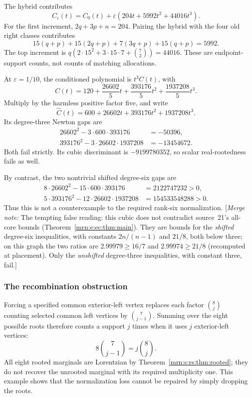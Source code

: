 \documentclass[11pt,a4paper]{article}
\theoremstyle{remark}\newtheorem{remark}[theorem]{Remark}
\newcommand{\mnote}[1]{[\textit{Merge note:} #1]}
\begin{document}
The hybrid contributes
\begin{equation}\label{mrn:s:rs:eq:perturb}
 C_\varepsilon(t)=C_0(t)+\varepsilon(204t+5992t^2+44016t^3).
\end{equation}
For the first increment, $2q+3p+n=204$. Pairing the hybrid with the four old right classes contributes
\[
 15(q+p)+15(2q+p)+7(3q+p)+15(q+p)=5992.
\]
The top increment is
$q(2\cdot15^2+3\cdot15\cdot7+\binom72)=44016$.
These are endpoint-support counts, not counts of matching allocations.

At $\varepsilon=1/10$, the conditioned polynomial is $t^3C(t)$, with
\begin{equation}\label{mrn:s:rs:eq:counter}
 C(t)=120+\frac{26602}{5}t+\frac{393176}{5}t^2
                    +\frac{1937208}{5}t^3.
\end{equation}
Multiply by the harmless positive factor five, and write
\[
 \widehat C(t)=600+26602t+393176t^2+1937208t^3.
\]
Its degree-three Newton gaps are
\begin{align*}
 26602^2-3\cdot600\cdot393176&=-50396,\\
 393176^2-3\cdot26602\cdot1937208&=-13454672.
\end{align*}
Both fail strictly. Its cubic discriminant is $-9199780352$, so scalar real-rootedness fails as well.

By contrast, the two nontrivial shifted degree-six gaps are
\begin{align*}
 8\cdot26602^2-15\cdot600\cdot393176&=2122747232>0,\\
 5\cdot393176^2-12\cdot26602\cdot1937208&=154533548288>0.
\end{align*}
Thus this is not a counterexample to the required rank-six normalization.
\mnote{The tempting false reading: this cubic does not contradict source~21's all-core bounds (Theorem~\ref{mrn:e:ec:thm:main}). They are bounds for the \emph{shifted} degree-six inequalities, with constants $2n/(n-1)$ and $21/8$, both below three; on this graph the two ratios are $2.99979\ge16/7$ and $2.99974\ge21/8$ (recomputed at placement). Only the \emph{unshifted} degree-three inequalities, with constant three, fail.}

\subsubsection{The recombination obstruction}
Forcing a specified common exterior-left vertex replaces each factor
$\binom8j$ counting selected common left vertices by $\binom7{j-1}$.
Summing over the eight possible roots therefore counts a support $j$ times when it uses $j$ exterior-left vertices:
\[
 8\binom7{j-1}=j\binom8j.
\]
All eight rooted marginals are Lorentzian by Theorem~\ref{mrn:s:rs:thm:rooted}; they do not recover the unrooted marginal with its required multiplicity one. This example shows that the normalization loss cannot be repaired by simply dropping the roots.
\end{document}
